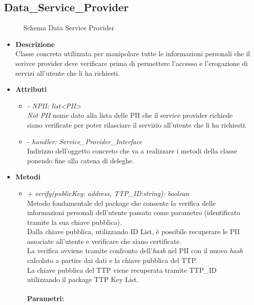 \subsection{Data\_Service\_Provider}
\begin{figure}[!h]
	\centering
	\caption{Schema Data Service Provider}
\end{figure}
\begin{itemize}
	\item \textbf{Descrizione}\\
	Classe concreta utilizzata per manipolare tutte le informazioni personali che il serivce provider deve verificare prima di permettere l'accesso e l'erogazione di servizi all'utente che li ha richiesti.
	\item \textbf{Attributi}
	\begin{itemize}
		\item \textit{- NPII: list<PII>}\\
		\textit{Not PII} nome dato alla lista delle \gls{PII} che il service provider richiede siano verificate per poter rilasciare il servizio all'utente che li ha richiesti.
		\item \textit{- handler: Service\_Provider\_Interface}\\
		Indirizzo dell'oggetto concreto che va a realizzare i metodi della classe ponendo fine alla catena di deleghe.
	\end{itemize}
	\item \textbf{Metodi}
	\begin{itemize}
		\item \textit{+ verify(publicKey: address, TTP\_ID:string): boolean}\\
		Metodo fondamentale del package che consente la verifica delle informazioni personali dell'utente passato come parametro (identificato tramite la sua chiave pubblica).\\
		Dalla chiave pubblica, utilizzando ID List, è possibile recuperare le \gls{PII} associate all'utente e verificare che siano certificate.\\
		La verifica avviene tramite confronto dell'\textit{hash} nel \gls{PII} con il nuovo \textit{hash} calcolato a partire dai dati e la chiave pubblica del \gls{TTP}.\\
		La chiave pubblica del \gls{TTP} viene recuperata tramite TTP\_ID utilizzando il package TTP Key List.\\\\
		\textbf{Parametri:}

\end{itemize}
\end{itemize}
